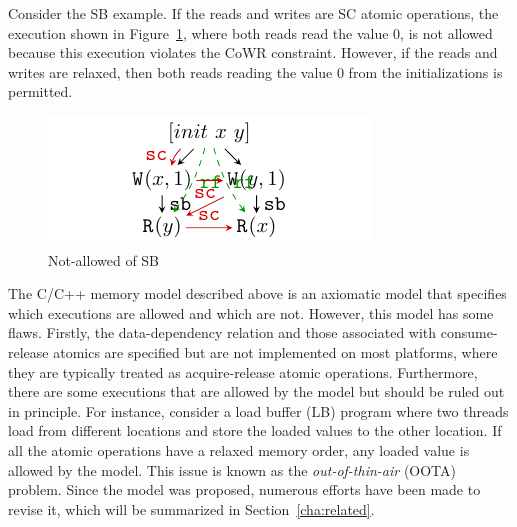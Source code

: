 Consider the SB example. If the reads and writes are SC atomic operations, the execution shown in Figure~\ref{NotAllowedSB}, where both reads read the value 0, is not allowed because this execution violates the CoWR constraint. However, if the reads and writes are relaxed, then both reads reading the value 0 from the initializations is permitted.


\begin{figure}[htbp] %
	\centering
	\includegraphics[scale=1.3]{figure/exec-graph/SB3.pdf} %
	\caption{Not-allowed of SB} %
	\label{NotAllowedSB} %
\end{figure}
% 



The C/C++ memory model described above is an axiomatic model that specifies which executions are allowed and which are not. However, this model has some flaws. Firstly, the data-dependency relation and those associated with consume-release atomics are specified but are not implemented on most platforms, where they are typically treated as acquire-release atomic operations. Furthermore, there are some executions that are allowed by the model but should be ruled out in principle. For instance, consider a load buffer (LB) program where two threads load from different locations and store the loaded values to the other location. If all the atomic operations have a relaxed memory order, any loaded value is allowed by the model. This issue is known as the \textit{out-of-thin-air} (OOTA) problem. Since the model was proposed, numerous efforts have been made to revise it, which will be summarized in Section~\ref{cha:related}.


